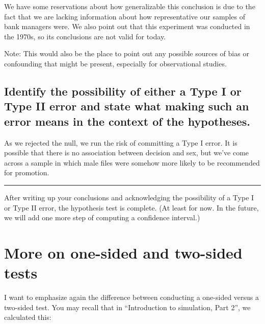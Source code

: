 \documentclass[
]{book}
\begin{document}
We have some reservations about how generalizable this conclusion is due to the fact that we are lacking information about how representative our samples of bank managers were. We also point out that this experiment was conducted in the 1970s, so its conclusions are not valid for today.

Note: This would also be the place to point out any possible sources of bias or confounding that might be present, especially for observational studies.

\hypertarget{hypothesis1-ex-errors}{%
\subsection{Identify the possibility of either a Type I or Type II error and state what making such an error means in the context of the hypotheses.}\label{hypothesis1-ex-errors}}

As we rejected the null, we run the risk of committing a Type I error. It is possible that there is no association between decision and sex, but we've come across a sample in which male files were somehow more likely to be recommended for promotion.

\begin{center}\rule{0.5\linewidth}{0.5pt}\end{center}

After writing up your conclusions and acknowledging the possibility of a Type I or Type II error, the hypothesis test is complete. (At least for now. In the future, we will add one more step of computing a confidence interval.)

\hypertarget{hypothesis1-one-sided-two-sided}{%
\section{More on one-sided and two-sided tests}\label{hypothesis1-one-sided-two-sided}}

I want to emphasize again the difference between conducting a one-sided versus a two-sided test. You may recall that in ``Introduction to simulation, Part 2'', we calculated this:
\end{document}
